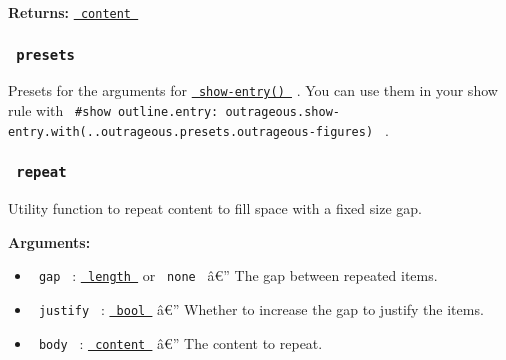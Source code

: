 \textbf{Returns:}
\href{https://typst.app/docs/reference/foundations/content/}{\texttt{\ content\ }}

\subsubsection{\texorpdfstring{\texttt{\ presets\ }}{ presets }}\label{presets}

Presets for the arguments for
\href{https://github.com/typst/packages/raw/main/packages/preview/outrageous/0.3.0/\#show-entry}{\texttt{\ show-entry()\ }}
. You can use them in your show rule with
\texttt{\ \#show\ outline.entry:\ outrageous.show-entry.with(..outrageous.presets.outrageous-figures)\ }
.

\begin{Shaded}
\begin{Highlighting}[]
\NormalTok{  ),}
\NormalTok{  ),}
\NormalTok{  ),}
\NormalTok{)}
\end{Highlighting}
\end{Shaded}

\subsubsection{\texorpdfstring{\texttt{\ repeat\ }}{ repeat }}\label{repeat}

Utility function to repeat content to fill space with a fixed size gap.

\begin{Shaded}
\begin{Highlighting}[]
\end{Highlighting}
\end{Shaded}

\textbf{Arguments:}

\begin{itemize}
\tightlist
\item
  \texttt{\ gap\ } :
  \href{https://typst.app/docs/reference/layout/length/}{\texttt{\ length\ }}
  or \texttt{\ none\ } â€'' The gap between repeated items.
\item
  \texttt{\ justify\ } :
  \href{https://typst.app/docs/reference/foundations/bool/}{\texttt{\ bool\ }}
  â€'' Whether to increase the gap to justify the items.
\item
  \texttt{\ body\ } :
  \href{https://typst.app/docs/reference/foundations/content/}{\texttt{\ content\ }}
  â€'' The content to repeat.
\end{itemize}

